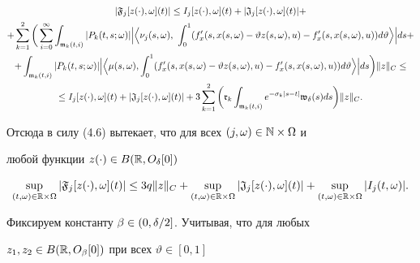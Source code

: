 \begin{gather*}


|\frak F_{j}[z(\cdot),\om](t)|\le I_{j}[z(\cdot),\om](t) +


|\frak J_{j}[z(\cdot),\om](t)|+ \\


%


+\sum\lt_{k=1}^{2}\bigg(\sum\lt_{i=0}^{\infty}\int_{\frak m_{k}(t,i)}


|P_{k}(t,s;\om)|\Big|\Big\la\nu_{j}(s,\om),\ \int_{0}^{1}


(f'_{x}(s,x(s,\om)-\vartheta z(s,\om),u)-f'_{x}(s,x(s,\om),u))


d\vartheta\Big\ra\Big|


ds+\\


%


+\int_{\frak m_{k}(t,i)}|P_{k}(t,s;\om)|


\Big|\Big\la\mu(s,\om),\int_{0}^{1}


(f'_{x}(s,x(s,\om)-\vartheta z(s,\om),u)-f'_{x}(s,x(s,\om),u))


d\vartheta\Big\ra\Big|ds\bigg)\|z\|_{C}\le\\


%


\le I_{j}[z(\cdot),\om](t) + |\frak J_{j}[z(\cdot),\om](t)|+


3\sum\lt_{k=1}^{2}\bigg(\frak r_{k}


\int_{\frak m_{k}(t,i)}e^{-\sigma_{k}|s-t|}


\frak w_{\dl}(s)ds\bigg)\|z\|_{C}.


\end{gather*}


Отсюда в силу (4.6) вытекает, что для всех $(j,\omega)\in\Bbb N\times\Omega$ и


любой функции $z(\cdot)\in B(\Bbb R,O_{\delta}[0])$


\begin{equation}


\sup\lt_{(t,\om)\in\R\times\Om}|\frak F_{j}[z(\cdot),\om](t)|\le 3q\|z\|_{C}+


\sup\lt_{(t,\om)\in\R\times\Om}|\frak J_{j}[z(\cdot),\om](t)|+


\sup\lt_{(t,\om)\in\R\times\Om}|I_{j}(t,\om)|.


\end{equation}


Фиксируем константу $\beta\in(0,\delta/2]$. Учитывая, что для любых


$z_{1}, z_{2}\in B(\Bbb R,O_{\beta}[0])$ при всех $\vartheta\in [0,1]$


